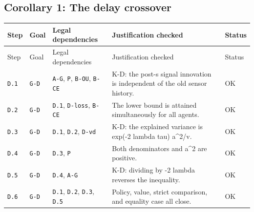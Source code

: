 \documentclass[11pt,letterpaper]{article}
\begin{document}
{\subsection{Corollary 1: The delay crossover}
\begin{longtable}{>{\raggedright\arraybackslash}p{.10\linewidth}>{\raggedright\arraybackslash}p{.08\linewidth}>{\raggedright\arraybackslash}p{.19\linewidth}>{\raggedright\arraybackslash}p{.46\linewidth}>{\raggedright\arraybackslash}p{.08\linewidth}}
\toprule
Step & Goal & Legal dependencies & Justification checked & Status \\
\midrule\endfirsthead
\toprule
Step & Goal & Legal dependencies & Justification checked & Status \\
\midrule\endhead
\bottomrule\endfoot
\texttt{D.1} & \texttt{G-D} & \texttt{A-G}, \texttt{P}, \texttt{B-OU}, \texttt{B-CE} & K-D: the post-s signal innovation is independent of the old sensor history. & OK \\[3pt]
\texttt{D.2} & \texttt{G-D} & \texttt{D.1}, \texttt{D-loss}, \texttt{B-CE} & The lower bound is attained simultaneously for all agents. & OK \\[3pt]
\texttt{D.3} & \texttt{G-D} & \texttt{D.1}, \texttt{D.2}, \texttt{D-vd} & K-D: the explained variance is exp(-2 lambda tau) a\textasciicircum{}2/v. & OK \\[3pt]
\texttt{D.4} & \texttt{G-D} & \texttt{D.3}, \texttt{P} & Both denominators and a\textasciicircum{}2 are positive. & OK \\[3pt]
\texttt{D.5} & \texttt{G-D} & \texttt{D.4}, \texttt{A-G} & K-D: dividing by -2 lambda reverses the inequality. & OK \\*[3pt]
\texttt{D.6} & \texttt{G-D} & \texttt{D.1}, \texttt{D.2}, \texttt{D.3}, \texttt{D.5} & Policy, value, strict comparison, and equality case all close. & OK \\[3pt]
\end{longtable}
}
\end{document}
